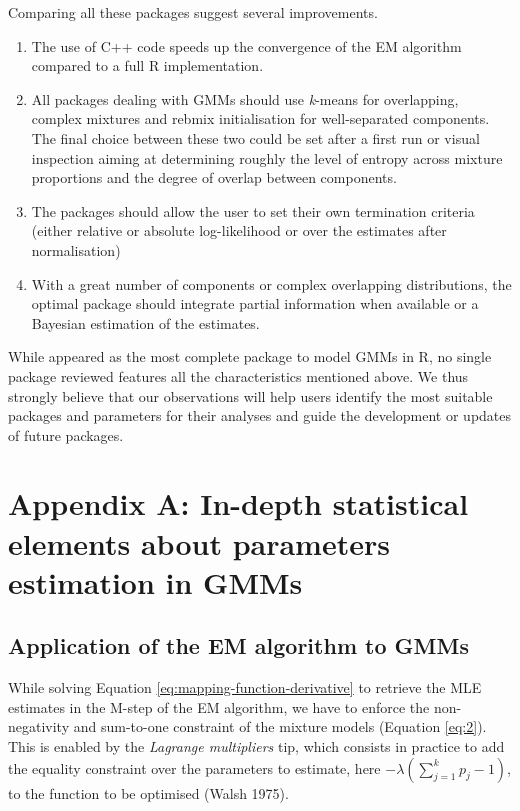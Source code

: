 Comparing all these packages suggest several improvements.

\begin{enumerate}
\def\labelenumi{\arabic{enumi}.}
\item
  The use of C++ code speeds up the convergence of the EM algorithm
  compared to a full R implementation.
\item
  All packages dealing with GMMs should use \emph{k}-means for overlapping, complex mixtures and rebmix initialisation for well-separated components. The final choice between these two could be set after a first run or visual
  inspection aiming at determining roughly the level of entropy across mixture proportions and the degree of overlap between components.
\item
  The packages should allow the user to set their own termination criteria (either relative or absolute log-likelihood or over the estimates after normalisation)
\item
  With a great number of components or complex overlapping distributions, the optimal package should integrate partial information when available or a Bayesian estimation of the
  estimates.
\end{enumerate}

While  appeared as the most complete package to model GMMs in R, no single package reviewed features all the characteristics mentioned above.
We thus strongly believe that our observations will help users identify the most suitable packages and parameters for their analyses and guide the
development or updates of future packages.

\newpage

\hypertarget{appendix-a-in-depth-statistical-elements-about-parameters-estimation-in-gmms}{%
\section{Appendix A: In-depth statistical elements about parameters estimation in GMMs}\label{appendix-a-in-depth-statistical-elements-about-parameters-estimation-in-gmms}}

\hypertarget{application-of-the-em-algorithm-to-gmms}{%
\subsection{Application of the EM algorithm to GMMs}\label{application-of-the-em-algorithm-to-gmms}}

While solving Equation \eqref{eq:mapping-function-derivative} to retrieve the MLE estimates in the M-step of the EM algorithm, we have to enforce the non-negativity and sum-to-one constraint of the mixture models (Equation
\eqref{eq:2}). This is enabled by the \emph{Lagrange multipliers} tip, which consists in practice to add the equality constraint over the parameters to estimate, here \(-\lambda (\sum_{j=1}^k p_j -1)\), to the function to be optimised (Walsh 1975).

